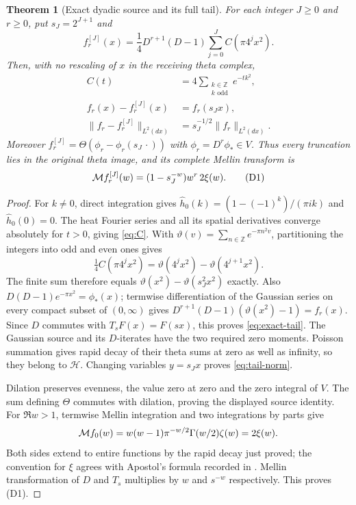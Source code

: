 \documentclass[11pt]{article}
\newtheorem{theorem}{Theorem}[section]
\begin{document}
\begin{theorem}[Exact dyadic source and its full tail]\label{thm:dyadic}
For each integer $J\geq0$ and $r\geq0$, put $s_J=2^{J+1}$ and
\[
 f_r^{[J]}(x)=\frac14D^{r+1}(D-1)
                 \sum_{j=0}^{J}C(\pi4^j x^2).
\]
Then, with no rescaling of $x$ in the receiving theta complex,
\begin{align}
 C(t)&=4\sum_{\substack{k\in\mathbb Z\\k\text{ odd}}}e^{-tk^2},\label{eq:C}\\
 f_r(x)-f_r^{[J]}(x)&=f_r(s_Jx),\label{eq:exact-tail}\\
 \|f_r-f_r^{[J]}\|_{L^2(dx)}&=s_J^{-1/2}\|f_r\|_{L^2(dx)}.\label{eq:tail-norm}
\end{align}
Moreover $f_r^{[J]}=\Theta(\phi_r-\phi_r(s_J\,\cdot))$ with
$\phi_r=D^r\phi_*\in V$. Thus every truncation lies in the original
theta image, and its complete Mellin transform is
\[
 \mathcal M f_r^{[J]}(w)=(1-s_J^{-w})w^r\,2\xi(w).
 \tag{D1}
\]
\end{theorem}
\begin{proof}
For $k\ne0$, direct integration gives
$\widehat h_0(k)=(1-(-1)^k)/(\pi i k)$ and $\widehat h_0(0)=0$.
The heat Fourier series and all its spatial derivatives converge absolutely
for $t>0$, giving \eqref{eq:C}. With
$\vartheta(v)=\sum_{n\in\mathbb Z}e^{-\pi n^2v}$, partitioning the
integers into odd and even ones gives
\[
 \tfrac14 C(\pi4^j x^2)=\vartheta(4^jx^2)-\vartheta(4^{j+1}x^2).
\]
The finite sum therefore equals
$\vartheta(x^2)-\vartheta(s_J^2x^2)$ exactly. Also
$D(D-1)e^{-\pi x^2}=\phi_*(x)$; termwise differentiation of the
Gaussian series on every compact subset of $(0,\infty)$ gives
$D^{r+1}(D-1)(\vartheta(x^2)-1)=f_r(x)$.
Since $D$ commutes with $T_sF(x)=F(sx)$, this proves
\eqref{eq:exact-tail}. The Gaussian source and its $D$-iterates have the
two required zero moments. Poisson summation gives rapid decay of their
theta sums at zero as well as infinity, so they belong to $\mathcal H$.
Changing variables $y=s_Jx$ proves \eqref{eq:tail-norm}.

Dilation preserves evenness, the value zero at zero and the zero integral
of $V$. The sum defining $\Theta$ commutes with dilation, proving the
displayed source identity. For $\Re w>1$, termwise Mellin integration and
two integrations by parts give
\[
 \mathcal M f_0(w)=w(w-1)\pi^{-w/2}\Gamma(w/2)\zeta(w)=2\xi(w).
\]
Both sides extend to entire functions by the rapid decay just proved;
the convention for $\xi$ agrees with Apostol's formula recorded in
\cite{cr:DLMF25}. Mellin transformation of $D$ and $T_s$ multiplies by $w$
and $s^{-w}$ respectively. This proves (D1).
\end{proof}
\end{document}

